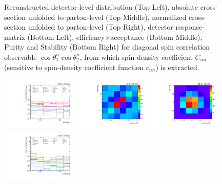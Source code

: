 \begin{refsection}
\begin{figure}[htb]
\begin{center}
\caption{Reconstructed detector-level distribution (Top Left), absolute cross-section unfolded to parton-level (Top Middle), normalized cross-section unfolded to parton-level (Top Right), detector response-matrix (Bottom Left), efficiency$\times$acceptance (Bottom Middle), Purity and Stability (Bottom Right) for diagonal spin correlation observable $\cos\theta_{1}^{n}\cos\theta_{2}^{n}$, from which spin-density coefficient $C_{nn}$ (sensitive to spin-density coefficient function $c_{n n}$) is extracted.}
\label{fig:c_nn}
\end{center}
\end{figure}
\clearpage
\begin{figure}[htb]
\begin{center}
 \includegraphics[width=0.32\textwidth]{fig_fullRun2UL/unfolding/combined/deltaSystCombinedlog_rebinnedB_c_nn.pdf}
 \includegraphics[width=0.32\textwidth]{fig_fullRun2UL/unfolding/combined/StatCovMatrix_rebinnedB_c_nn.pdf}
 \includegraphics[width=0.32\textwidth]{fig_fullRun2UL/unfolding/combined/TotalSystCovMatrix_rebinnedB_c_nn.pdf} \\
 \includegraphics[width=0.32\textwidth]{fig_fullRun2UL/unfolding/combined/deltaSystCombinedlogNorm_rebinnedB_c_nn.pdf}

\end{center}
\end{figure}
\end{refsection}
